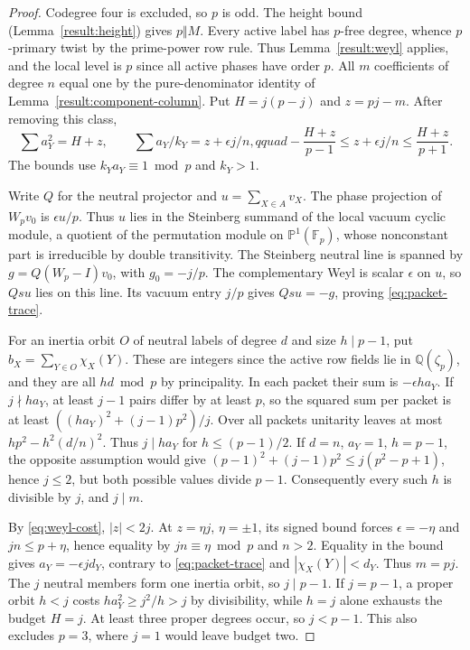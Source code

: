 \documentclass[11pt]{amsart}
\numberwithin{equation}{section}
\theoremstyle{definition}
\theoremstyle{plain}
\newcommand{\QQ}{\mathbb Q}
\begin{document}
\begin{proof}
Codegree four is excluded, so $p$ is odd. The height bound
(Lemma~\ref{result:height}) gives $p\Vert M$. Every active label
has $p$-free degree, whence $p$-primary twist by the prime-power
row rule. Thus Lemma~\ref{result:weyl} applies, and the local level
is $p$ since all active phases have order $p$.
All $m$ coefficients of degree $n$ equal one by the pure-denominator
identity of Lemma~\ref{result:component-column}.
Put $H=j(p-j)$ and $z=pj-m$. After removing this class,
\begin{equation}\label{eq:weyl-cost}
 \sum a_Y^2=H+z,\qquad \sum a_Y/k_Y=z+\epsilon j/n,qquad
 -\frac{H+z}{p-1}\le z+\epsilon j/n\le\frac{H+z}{p+1}.
\end{equation}
The bounds use $k_Ya_Y\equiv1\bmod p$ and $k_Y>1$.

Write $Q$ for the neutral projector and $u=\sum_{X\in A}v_X$.
The phase projection of $W_pv_0$ is $\epsilon u/p$. Thus $u$
lies in the Steinberg summand of the local vacuum cyclic module,
a quotient of the permutation module on $\mathbb P^1(\mathbb F_p)$,
whose nonconstant part is irreducible by double transitivity. The Steinberg neutral line
is spanned by $g=Q(W_p-I)v_0$, with $g_0=-j/p$. The complementary
Weyl is scalar $\epsilon$ on $u$, so $Qsu$ lies on this line.
Its vacuum entry $j/p$ gives $Qsu=-g$, proving \eqref{eq:packet-trace}.

For an inertia orbit $O$ of neutral labels of degree $d$ and
size $h\mid p-1$, put $b_X=\sum_{Y\in O}\chi_X(Y)$. These are
integers since the active row fields lie in $\QQ(\zeta_p)$, and
they are all $hd\bmod p$ by principality. In each packet their
sum is $-\epsilon h a_Y$. If $j\nmid h a_Y$, at least $j-1$
pairs differ by at least $p$, so the squared sum per packet is at
least $((h a_Y)^2+(j-1)p^2)/j$. Over all packets unitarity leaves
at most $hp^2-h^2(d/n)^2$. Thus $j\mid h a_Y$ for $h\le(p-1)/2$.
If $d=n$, $a_Y=1$, $h=p-1$, the opposite assumption would give
$(p-1)^2+(j-1)p^2\le j(p^2-p+1)$, hence $j\le2$, but both possible values divide
$p-1$. Consequently every such $h$ is divisible by $j$, and $j\mid m$.

By \eqref{eq:weyl-cost}, $|z|<2j$. At $z=\eta j$, $\eta=\pm1$,
its signed bound forces $\epsilon=-\eta$ and $jn\le p+\eta$,
hence equality by $jn\equiv\eta\bmod p$ and $n>2$.
Equality in the bound gives $a_Y=-\epsilon j d_Y$, contrary to
\eqref{eq:packet-trace} and $|\chi_X(Y)|<d_Y$. Thus $m=pj$.
The $j$ neutral members form one inertia orbit, so $j\mid p-1$.
If $j=p-1$, a proper orbit $h<j$ costs
$ha_Y^2\ge j^2/h>j$ by divisibility, while $h=j$ alone exhausts
the budget $H=j$. At least three proper degrees occur, so $j<p-1$.
This also excludes $p=3$, where $j=1$ would leave budget two.
\end{proof}
\end{document}
